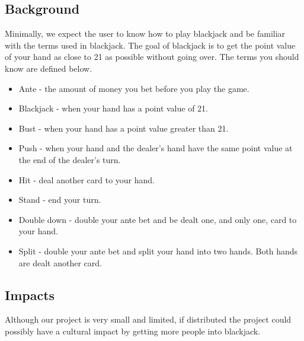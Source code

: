 \documentclass[10pt,conference,onecolumn,compsoc]{IEEEtran}
\begin{document}
\subsection{Background}
Minimally, we expect the user to know how to play blackjack and be familiar with the terms used in blackjack. The goal of blackjack is to get the point value of your hand as close to 21 as possible without going over. The terms you should know are defined below.\\
\newline
\begin{itemize}
\item{Ante - the amount of money you bet before you play the game.}
\item{Blackjack - when your hand has a point value of 21.}
\item{Bust - when your hand has a point value greater than 21.}
\item{Push - when your hand and the dealer's hand have the same point value at the end of the dealer's turn.}
\item{Hit - deal another card to your hand.}
\item{Stand - end your turn.}
\item{Double down - double your ante bet and be dealt one, and only one, card to your hand.}
\item{Split - double your ante bet and split your hand into two hands. Both hands are dealt another card.}
\end{itemize}

\subsection{Impacts}
Although our project is very small and limited, if distributed the project could possibly have a cultural impact by getting more people into blackjack.
\end{document}
